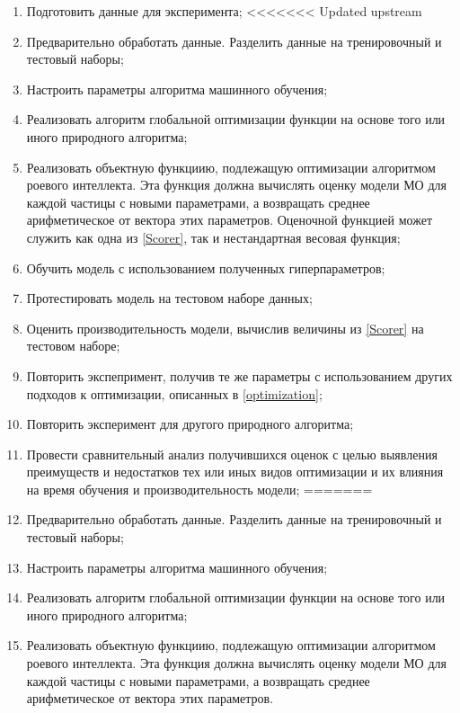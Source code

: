 \begin{enumerate}
    \item Подготовить данные для эксперимента;
          <<<<<<< Updated upstream
    \item Предварительно обработать данные. Разделить данные на тренировочный
          и тестовый наборы;
    \item Настроить параметры алгоритма машинного обучения;
    \item Реализовать алгоритм глобальной оптимизации функции на основе того или иного природного алгоритма;
    \item Реализовать объектную функциию, подлежащую оптимизации алгоритмом роевого интеллекта.
          Эта функция должна вычислять оценку модели МО для каждой частицы с новыми параметрами, а
          возвращать среднее арифметическое от вектора этих параметров.
          Оценочной функцией может служить как одна из \ref{Scorer}, так и
          нестандартная весовая функция;
    \item Обучить модель с использованием полученных гиперпараметров;
    \item Протестировать модель на тестовом наборе данных;
    \item Оценить производительность модели, вычислив величины из \ref{Scorer} на
          тестовом наборе;
    \item Повторить экспепримент, получив те же параметры с использованием
          других подходов к оптимизации, описанных в \ref{optimization};
    \item Повторить эксперимент для другого природного алгоритма;
    \item Провести сравнительный анализ получившихся оценок с целью выявления
          преимуществ и недостатков тех или иных видов оптимизации и их влияния на
          время обучения и производительность модели;
          =======
    \item Предварительно обработать данные. Разделить данные на тренировочный
          и тестовый наборы;
    \item Настроить параметры алгоритма машинного обучения;
    \item Реализовать алгоритм глобальной оптимизации функции на основе того или иного природного алгоритма;
    \item Реализовать объектную функциию, подлежащую оптимизации алгоритмом роевого интеллекта.
          Эта функция должна вычислять оценку модели МО для каждой частицы с новыми параметрами, а
          возвращать среднее арифметическое от вектора этих параметров.

\end{enumerate}
